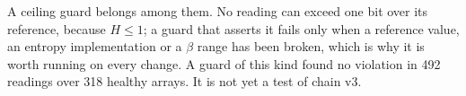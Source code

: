 A ceiling guard belongs among them. No reading can exceed one bit over its reference, because $H\le1$; a guard that asserts it fails only
when a reference value, an entropy implementation or a $\beta$ range has been broken, which is why it is worth running on every change.
\derived{} A guard of this kind found no violation in 492 readings over 318 healthy arrays.
\measured{} It is not yet a test of chain v3. \openprob
